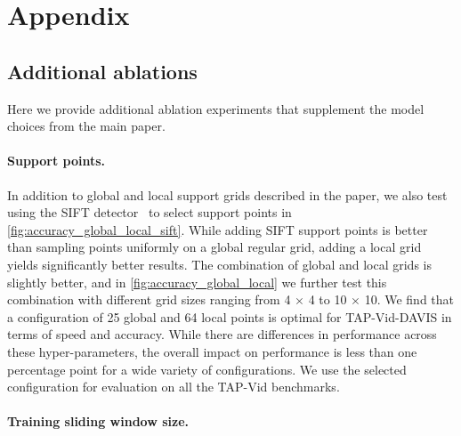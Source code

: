 \renewcommand{\thesubsection}{\Alph{subsection}}


\section*{Appendix}
\subsection{Additional ablations}
Here we provide additional ablation experiments that supplement the model choices from the main paper.

\paragraph{Support points.}


In addition to global and local support grids described in the paper, we also test using the SIFT detector~\cite{lowe04distinctive} to select support points in \cref{fig:accuracy_global_local_sift}.
While adding SIFT support points is better than sampling points uniformly on a global regular grid, adding a local grid yields significantly better results.
The combination of global and local grids is slightly better, and in  \cref{fig:accuracy_global_local} we further test this combination with different grid sizes ranging from 4 $\times$ 4 to 10 $\times$ 10.
We find that a configuration of 25 global and 64 local points is optimal for TAP-Vid-DAVIS in terms of speed and accuracy.
While there are differences in performance across these hyper-parameters, the overall impact on performance is less than one percentage point for a wide variety of configurations.
We use the selected configuration for evaluation on all the TAP-Vid benchmarks.


\begin{figure}[tb]
    \begin{minipage}{.47\linewidth}
        \centering
        \setlength\tabcolsep{0.9pt}
       
    \end{minipage}%
    \hspace{0.02\linewidth}
    \begin{minipage}{0.5\linewidth}
        \centering
        \setlength\tabcolsep{1pt}
        
    \end{minipage}
\end{figure}

\paragraph{Training sliding window size.}

